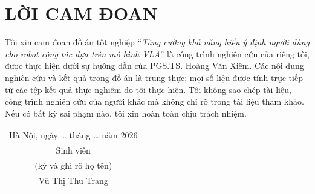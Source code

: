 \documentclass[a4paper,oneside]{report}
\newcommand{\ThesisTitleText}{Tăng cường khả năng hiểu ý định người dùng cho robot cộng tác dựa trên mô hình VLA}
\newcommand{\StudentName}{Vũ Thị Thu Trang}
\newcommand{\SupervisorName}{PGS.TS. Hoàng Văn Xiêm}
\newcommand{\ThesisYear}{2026}
\begin{document}
\chapter*{LỜI CAM ĐOAN}
Tôi xin cam đoan đồ án tốt nghiệp ``\textit{\ThesisTitleText}'' là công trình nghiên cứu của riêng tôi, được thực hiện dưới sự hướng dẫn của \SupervisorName. Các nội dung nghiên cứu và kết quả trong đồ án là trung thực; mọi số liệu được tính trực tiếp từ các tệp kết quả thực nghiệm do tôi thực hiện. Tôi không sao chép tài liệu, công trình nghiên cứu của người khác mà không chỉ rõ trong tài liệu tham khảo. Nếu có bất kỳ sai phạm nào, tôi xin hoàn toàn chịu trách nhiệm.

\vspace{1cm}
\begin{flushright}
\begin{tabular}{c}
Hà Nội, ngày \dots{} tháng \dots{} năm \ThesisYear\\
Sinh viên\\
(ký và ghi rõ họ tên)\\[2.2cm]
\StudentName
\end{tabular}
\end{flushright}

\cleardoublepage
{\tableofcontents}

\end{document}

